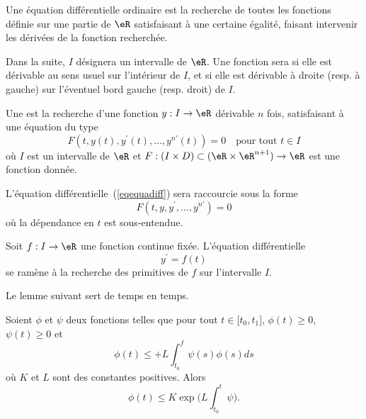 
Une équation différentielle ordinaire est la recherche de toutes les fonctions définie sur une partie de $\eR$ satisfaisant à une certaine égalité, faisant intervenir les dérivées de la fonction recherchée.

Dans la suite, $I$ désignera un intervalle de $\eR$. Une fonction sera  si elle est dérivable au sens usuel sur l'intérieur de $I$, et si elle est dérivable à droite (resp. à gauche) sur l'éventuel bord gauche (resp. droit) de $I$.

\begin{definition}
  Une  est la recherche d'une fonction $y : I \to \eR$ dérivable $n$ fois, satisfaisant à une équation du type
  \begin{equation}\label{eqequadiff}
    F(t, y(t), y^\prime(t), \ldots, y^{n\prime}(t)) = 0 \quad \text{pour tout }t \in I
  \end{equation}
  où $I$ est un intervalle de $\eR$ et \begin{math}F : (I \times D) \subset (\eR\times\eR^{n+1})\to \eR\end{math} est une fonction donnée.
\end{definition}

\begin{remark}
L'équation différentielle~(\ref{eqequadiff}) sera raccourcie sous la forme
  \begin{equation}
    F(t, y, y^\prime, \ldots, y^{n\prime}) = 0
  \end{equation}
  où la dépendance en $t$ est sous-entendue.
\end{remark}

\begin{example}
	Soit $f : I \to \eR$ une fonction continue fixée. L'équation différentielle
	\begin{equation}
		y^\prime = f(t)
	\end{equation}
	se ramène à la recherche des primitives de $f$ sur l'intervalle $I$.
\end{example}

Le lemme suivant sert de temps en temps.
\begin{lemma} \label{LemuBVozy}
    Soient \( \phi\) et \( \psi\) deux fonctions telles que pour tout \( t\in\mathopen[ t_0 , t_1 \mathclose]\), \( \phi(t)\geq 0\), \( \psi(t)\geq 0\) et
    \begin{equation}
        \phi(t)\leq +L\int_{t_0}^f\psi(s)\phi(s)ds
    \end{equation}
    où \( K\) et \( L\) sont des constantes positives. Alors
    \begin{equation}
        \phi(t)\leq K\exp\big( L\int_{t_0}^t\psi \big).
    \end{equation}
\end{lemma}

